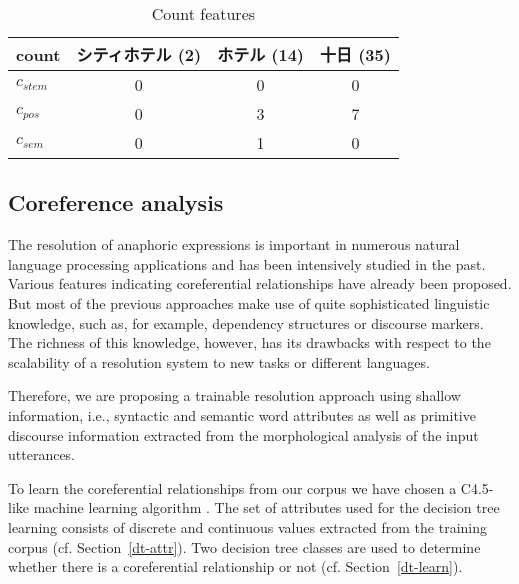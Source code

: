 \setlength{\tabcolsep}{10pt}
\begin{table}[hbt]
   \vspace*{-0.75\baselineskip}
   \begin{center}
   \begin{footnotesize}
    \caption{Count features}\label{tab-count} 
    \vspace*{0.5em}
     \begin{tabular}{|l|ccc|}
      \hline
      \multicolumn{1}{|c|}{count}  & シティホテル (2) &  ホテル (14)      & 十日 (35)  \\
      \hline \hline
      $c_{stem}$ & 0               &  0               & 0  \\
      $c_{pos}$  & 0               &  3               & 7   \\
      $c_{sem}$  & 0               &  1               & 0  \\
     \hline
     \end{tabular}
   \end{footnotesize}
   \end{center}
   \vspace*{-0.75\baselineskip}
\end{table}

\subsection{Coreference analysis}
\label{coref-analysis}

The resolution of anaphoric expressions is important in numerous
natural language processing applications and has been intensively
studied in the past. Various features indicating coreferential
relationships have already been proposed. But most of the previous
approaches make use of quite sophisticated linguistic knowledge, such as,
for example, dependency structures or discourse markers.
The richness of this knowledge, however, has its drawbacks
with respect to the scalability of a resolution system to new tasks or different languages.

Therefore, we are proposing a trainable resolution approach using shallow information,
i.e., syntactic and semantic word attributes as well as primitive discourse information
extracted from the morphological analysis of the input utterances.

To learn the coreferential relationships from our corpus we have chosen
a C4.5-like machine learning algorithm \cite{Quinlan93}. 
The set of attributes used for the decision tree learning consists of discrete
and continuous values extracted from the training corpus (cf. Section~\ref{dt-attr}).
Two decision tree classes are used to determine whether there is a coreferential
relationship or not (cf. Section~\ref{dt-learn}).

